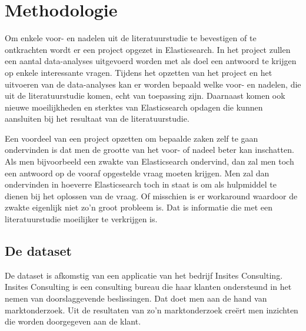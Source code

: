 
\chapter{Methodologie}
\label{ch:methodologie}


Om enkele voor- en nadelen uit de literatuurstudie te bevestigen of te ontkrachten wordt er een project opgezet in Elasticsearch. In het project zullen een aantal data-analyses uitgevoerd worden met als doel een antwoord te krijgen op enkele interessante vragen. Tijdens het opzetten van het project en het uitvoeren van de data-analyses kan er worden bepaald welke voor- en nadelen, die uit de literatuurstudie komen, echt van toepassing zijn. Daarnaast komen ook nieuwe moeilijkheden en sterktes van Elasticsearch opdagen die kunnen aansluiten bij het resultaat van de literatuurstudie.

Een voordeel van een project opzetten om bepaalde zaken zelf te gaan ondervinden is dat men de grootte van het voor- of nadeel beter kan inschatten. Als men bijvoorbeeld een zwakte van Elasticsearch ondervind, dan zal men toch een antwoord op de vooraf opgestelde vraag moeten krijgen. Men zal dan ondervinden in hoeverre Elasticsearch toch in staat is om als hulpmiddel te dienen bij het oplossen van de vraag. Of misschien is er workaround waardoor de zwakte eigenlijk niet zo'n groot probleem is. Dat is informatie die met een literatuurstudie moeilijker te verkrijgen is.

\section{De dataset}
De dataset is afkomstig van een applicatie van het bedrijf Insites Consulting. Insites Consulting is een consulting bureau die haar klanten ondersteund in het nemen van doorslaggevende beslissingen. Dat doet men aan de hand van marktonderzoek. Uit de resultaten van zo'n marktonderzoek creërt men inzichten die worden doorgegeven aan de klant. 

